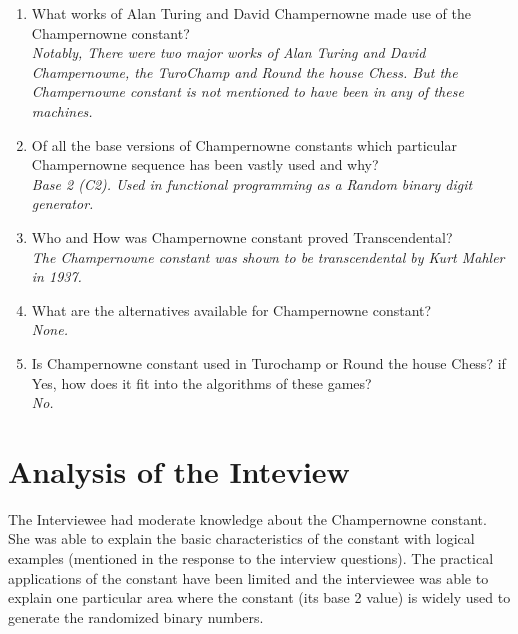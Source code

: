 \documentclass{article}
\begin{document}
\begin{enumerate}
	\\ {\it No.}
	\item What works of Alan Turing and David Champernowne made use of the Champernowne constant?
	\\ {\it Notably, There were two major works of Alan Turing and David Champernowne, the TuroChamp and Round the house Chess. But the Champernowne constant is not mentioned to have been in any of these machines.}
	\item Of all the base versions of Champernowne constants which particular Champernowne sequence has been vastly used and why?
	\\{\it Base 2 (C2). Used in functional programming as a Random binary digit generator.}
	\item Who and How was Champernowne constant proved Transcendental? 
	\\ {\it The Champernowne constant was shown to be transcendental by Kurt Mahler in 1937.}
	\item What are the alternatives available for Champernowne constant?
	\\ {\it None.}
	\item Is Champernowne constant used in Turochamp or Round the house Chess? if Yes, how does it fit into the algorithms of these games?
	\\ {\it No. }
\end{enumerate}
\section*{Analysis of the Inteview}
\quad The Interviewee had moderate knowledge about the Champernowne constant. She was able to explain the basic characteristics of the constant with logical examples (mentioned in the response to the interview questions). The practical applications of the constant have been limited and the interviewee was able to explain one particular area where the constant (its base 2 value) is widely used to generate the randomized binary numbers.
\end{document}
